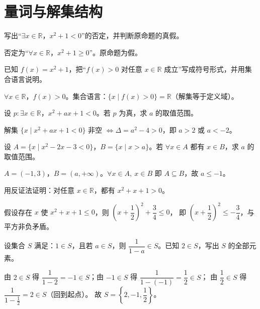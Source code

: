 \section{量词与解集结构}

\begin{problem}
写出“$\exists x\in\mathbb{R}$，$x^2+1<0$”的否定，并判断原命题的真假。
\end{problem}
\begin{solution}
否定为“$\forall x\in\mathbb{R}$，$x^2+1\geq0$”。原命题为假。
\end{solution}

\begin{problem}
已知 $f(x)=x^2+1$，把“$f(x)>0$ 对任意 $x\in\mathbb{R}$ 成立”写成符号形式，并用集合语言说明。
\end{problem}
\begin{solution}
$\forall x\in\mathbb{R}$，$f(x)>0$。集合语言：$\{x\mid f(x)>0\}=\mathbb{R}$（解集等于定义域）。
\end{solution}

\begin{problem}
设 $p:\exists x\in\mathbb{R}$，$x^2+ax+1<0$。若 $p$ 为真，求 $a$ 的取值范围。
\end{problem}
\begin{solution}
解集 $\{x\mid x^2+ax+1<0\}$ 非空 $\iff\Delta=a^2-4>0$，即 $a>2$ 或 $a<-2$。
\end{solution}

\begin{problem}
设 $A=\{x\mid x^2-2x-3<0\}$，$B=\{x\mid x>a\}$。若 $\forall x\in A$ 都有 $x\in B$，求 $a$ 的取值范围。
\end{problem}
\begin{solution}
$A=(-1,3)$，$B=(a,+\infty)$。$\forall x\in A,\ x\in B$ 即 $A\subseteq B$，故 $a\le-1$。
\end{solution}

\begin{problem}
用反证法证明：对任意 $x\in\mathbb{R}$，都有 $x^2+x+1>0$。
\end{problem}
\begin{solution}
假设存在 $x$ 使 $x^2+x+1\leq0$，则 $\left(x+\dfrac12\right)^2+\dfrac34\leq0$，
即 $\left(x+\dfrac12\right)^2\leq-\dfrac34$，与平方非负矛盾。
\end{solution}

\begin{problem}
设集合 $S$ 满足：$1\in S$，且若 $a\in S$，则 $\dfrac{1}{1-a}\in S$。已知 $2\in S$，写出 $S$ 的全部元素。
\end{problem}
\begin{solution}
由 $2\in S$ 得 $\dfrac{1}{1-2}=-1\in S$；由 $-1\in S$ 得 $\dfrac{1}{1-(-1)}=\dfrac12\in S$；
由 $\dfrac12\in S$ 得 $\dfrac{1}{1-\frac12}=2\in S$（回到起点）。
故 $S=\left\{2,-1,\dfrac12\right\}$。
\end{solution}

